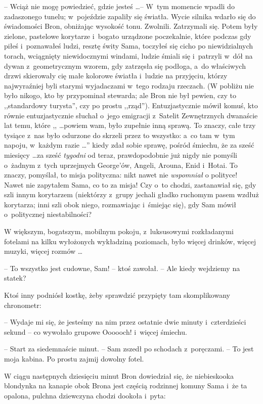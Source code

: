 \documentclass[oneside,polish,11pt,rmheadings]{mwbk}
\begin{document}
-- Wciąż nie mogę powiedzieć, gdzie jesteś \ldots  -- W~tym momencie wpadli do zadaszonego tunelu; w~pojeździe zapaliły się światła. Wycie silnika wdarło się do świadomości Bron, obniżając wysokość tonu. Zwolnili. Zatrzymali się. Potem były zielone, pastelowe korytarze i~bogato urządzone poczekalnie, które podczas gdy piłeś i~poznawałeś ludzi, resztę świty Sama, toczyłeś się cicho po niewidzialnych torach, wciągnięty niewidocznymi windami, ludzie śmiali się i~patrzyli w~dół na dywan z~geometrycznym wzorem, gdy zatrzęsła się podłoga, a~do właściwych drzwi skierowały cię małe kolorowe światła i~ludzie na przyjęciu, którzy najwyraźniej byli starymi wyjadaczami w~tego rodzaju rzeczach. (W pobliżu nie było nikogo, kto by przypominał stewarda; ale Bron nie był pewien, czy to ,,standardowy turysta'', czy po prostu ,,rząd''). Entuzjastycznie mówił komuś, kto równie entuzjastycznie słuchał o~jego emigracji z~Satelit Zewnętrznych dwanaście lat temu, które ,, \ldots  powiem wam, było zupełnie inną sprawą. To znaczy, całe trzy tysiące z~nas było odurzone do skrzeli przez to wszystko: a~co tam w~tym napoju, w~każdym razie \ldots '' kiedy zdał sobie sprawę, pośród śmiechu, że za sześć miesięcy \ldots  za sześć \textit{tygodni} od teraz, prawdopodobnie już nigdy nie pomyśli o~żadnym z~tych uprzejmych George'ów, Angeli, Arouna, Enid i~Hotai. To znaczy, pomyślał, to misja polityczna: nikt nawet nie \textit{wspomniał }o polityce! Nawet nie zapytałem Sama, co to za misja! Czy o~to chodzi, zastanawiał się, gdy szli innym korytarzem (niektórzy z~grupy jechali gładko ruchomym pasem wzdłuż korytarza; inni szli obok niego, rozmawiając i~śmiejąc się), gdy Sam mówił o~politycznej niestabilności? 

W większym, bogatszym, mobilnym pokoju, z~luksusowymi rozkładanymi fotelami na kilku wyłożonych wykładziną poziomach, było więcej drinków, więcej muzyki, więcej rozmów \ldots  

-- To wszystko jest cudowne, Sam! -- ktoś zawołał. -- Ale kiedy wejdziemy na statek? 

Ktoś inny podniósł kostkę, żeby sprawdzić przypięty tam skomplikowany chronometr: 

-- Wydaje mi się, że jesteśmy na nim przez ostatnie dwie minuty i~czterdzieści sekund -- co wywołało grupowe Oooooch! i~więcej śmiechu. 

-- Start za siedemnaście minut. -- Sam zszedł po schodach z~poręczami. -- To jest moja kabina. Po prostu zajmij dowolny fotel. 

W ciągu następnych dziesięciu minut Bron dowiedział się, że niebieskooka blondynka na kanapie obok Brona jest częścią rodzinnej komuny Sama i~że ta opalona, pulchna dziewczyna chodzi dookoła i~pyta: 
\end{document}
